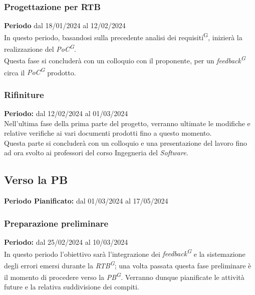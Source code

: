 \documentclass[5pt]{article}
\begin{document}
\subsubsection{Progettazione per RTB}
\textbf{Periodo} dal 18/01/2024 al 12/02/2024 
\vspace{0.3cm} \\
In questo periodo, basandosi sulla precedente analisi dei requisiti\textsuperscript{G}, inizierà la realizzazione del \textit{PoC\textsuperscript{G}}. \\
Questa fase si concluderà con un colloquio con il proponente, per un \textit{feedback\textsuperscript{G}} circa il \textit{PoC\textsuperscript{G}} prodotto.
\subsubsection{Rifiniture}
\textbf{Periodo:} dal 12/02/2024 al 01/03/2024 
\vspace{0.3cm} \\
Nell'ultima fase della prima parte del progetto, verranno ultimate le modifiche e relative verifiche ai vari documenti 
prodotti fino a questo momento. \\
Questa parte si concluderà con un colloquio e una presentazione del lavoro fino ad ora svolto 
ai professori del corso Ingegneria del \textit{Software}.

\subsection{Verso la PB}
\textbf{Periodo Pianificato:} dal 01/03/2024 al 17/05/2024
\subsubsection{Preparazione preliminare}
\textbf{Periodo:} dal 25/02/2024 al 10/03/2024 
\vspace{0.3cm} \\
In questo periodo l'obiettivo sarà l'integrazione dei \textit{feedback\textsuperscript{G}} e la sistemazione degli errori emersi durante la \textit{RTB\textsuperscript{G}}; 
una volta passata questa fase preliminare è il momento di procedere verso la \textit{PB\textsuperscript{G}}.
Verranno dunque pianificate le attività future e la relativa suddivisione dei compiti.
\end{document}
